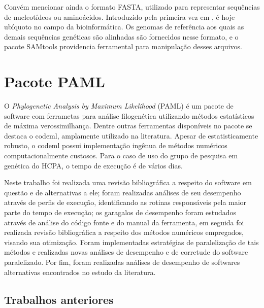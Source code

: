 \documentclass[cic,tc]{iiufrgs}
\begin{document}
Convém mencionar ainda o formato FASTA, utilizado para representar sequências
de nucleotídeos ou aminoácidos. Introduzido pela primeira vez em
\cite{doi:10.1126/science.298342}, é hoje ubíquoto no campo da
bioinformática.\cite{shen2016seqkit} Os genomas de referência aos quais as
demais sequências genéticas são alinhadas são fornecidos nesse formato, e o
pacote SAMtools providencia ferramental para manipulação desses arquivos.


\chapter{Pacote PAML}

O \textit{Phylogenetic Analysis by Maximum Likelihood} (PAML) é um pacote de
software com ferrametas para análise filogenética utilizando métodos
estatísticos de máxima verossimilhança.\cite{yang2007paml} Dentre
outras ferramentas disponíveis no pacote se destaca o codeml,
amplamente utilizado na literatura.\cite{maldonado2016lmap} Apesar de
estatisticamente robusto,\cite{maldonado2016lmap} o codeml possui
implementação ingênua de métodos numéricos computacionalmente
custosos.\cite{yang2020paml} Para o caso de uso do grupo de pesquisa em
genética do HCPA, o tempo de execução é de vários dias.

Neste trabalho foi realizada uma revisão bibliográfica a respeito do software
em questão e de alternativas a ele; foram realizadas análises de seu desempenho
através de perfis de execução, identificando as rotinas responsáveis pela maior
parte do tempo de execução; os garagalos de desempenho foram estudados através
de análise do código fonte e do manual da ferramenta, em seguida foi realizada
revisão bibliográfica a respeito dos métodos numéricos empregados, visando sua
otimização. Foram implementadas estratégias de paralelização de tais métodos e
realizadas novas análises de desempenho e de corretude do software
paralelizado. Por fim, foram realizadas análises de desempenho de softwares
alternativas encontrados no estudo da literatura.

\section{Trabalhos anteriores}
\end{document}
